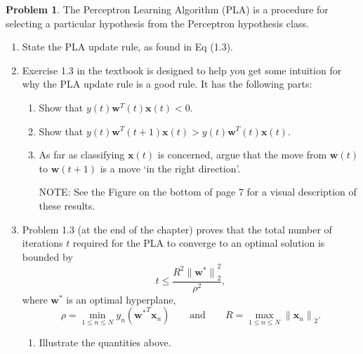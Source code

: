 \documentclass[10pt]{article}
\theoremstyle{definition}
\newtheorem{problem}{Problem}
\newcommand{\trans}[1]{{#1}^{T}}
\newcommand{\w}{\mathbf w}
\newcommand{\wstar}{{\w}^{*}}
\newcommand{\x}{\mathbf x}
\newcommand{\ltwo}[1]{{\lVert {#1} \rVert}_2}
\begin{document}
\newpage
\begin{problem}
    The Perceptron Learning Algorithm (PLA) is a procedure for selecting a particular hypothesis from the Perceptron hypothesis class.
    \begin{enumerate}
        \item State the PLA update rule, as found in Eq (1.3).
            \vspace{4in}
        \item Exercise 1.3 in the textbook is designed to help you get some intuition for why the PLA update rule is a good rule.
            It has the following parts:
            \begin{enumerate}
                \item Show that $y(t)\trans\w(t)\x(t) < 0$.
                    \vspace{4in}
                \item Show that $y(t)\trans\w(t+1)\x(t) > y(t)\trans\w(t)\x(t)$.
                    \vspace{4in}
                \item As far as classifying $\x(t)$ is concerned, argue that the move from $\w(t)$ to $\w(t+1)$ is a move `in the right direction'.

                    NOTE: See the Figure on the bottom of page 7 for a visual description of these results.
                    \vspace{4in}
            \end{enumerate}
            \newpage
        \item 
            Problem 1.3 (at the end of the chapter) proves that the total number of iterations $t$ required for the PLA to converge to an optimal solution is bounded by
            \begin{equation}
                t \le \frac{R^2 \ltwo{\wstar}^2}{\rho^2},
            \end{equation}
            where $\wstar$ is an optimal hyperplane,
    \begin{equation}
        \rho = \min_{1\le n\le N} y_n(\trans\wstar\x_n)
            \qquad\text{and}\qquad
        R = \max_{1\le n\le N} \ltwo{\x_n}.
    \end{equation}
            \begin{enumerate}
                \item
                    Illustrate the quantities above.


\end{enumerate}
\end{enumerate}
\end{problem}
\end{document}

